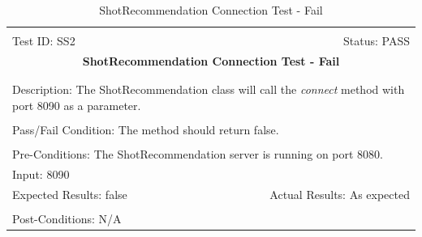 \documentclass[11pt]{article}
\begin{document}
\begin{center}
\begin{table}[H]
\begin{tabular}{|l r|}\hline&\\[-2mm]
	Test ID: SS2	&Status: PASS\\[-3mm]
	\multicolumn{2}{|c|}{\textbf{\large{ShotRecommendation Connection Test - Fail}}}\\&\\\hline&\\[-3mm]
	\multicolumn{2}{|p{\textwidth}|}{Description: The ShotRecommendation class will call the \textit{connect} method with port 8090 as a parameter.}\\[1mm]\hline&\\[-3mm]
	\multicolumn{2}{|p{\textwidth}|}{Pass/Fail Condition: The method should return false.}\\[1mm]\hline&\\[-3mm]
	\multicolumn{2}{|p{\textwidth}|}{Pre-Conditions: The ShotRecommendation server is running on port 8080.}\\[4mm]
	\multicolumn{2}{|p{\textwidth}|}{Input: 8090}\\[2mm]\hline
	\multicolumn{1}{|p{0.49\textwidth}}{Expected Results: false}	&\multicolumn{1}{|p{0.45\textwidth}|}{Actual Results: As expected}\\\hline&\\[-3mm]
	\multicolumn{2}{|p{\textwidth}|}{Post-Conditions: N/A}\\\hline
\end{tabular}
\caption{ShotRecommendation Connection Test - Fail}
\end{table}
\end{center}
\end{document}
